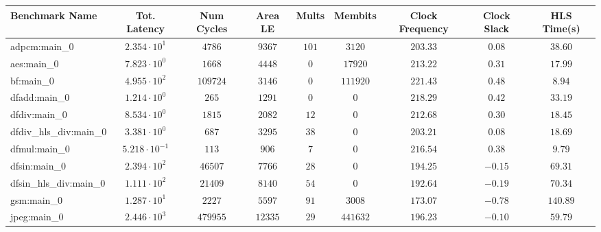 \begin{tabular}{|l|c|c|c|c|c|c|c|c|}
\hline
Benchmark Name          & Tot. Latency            & Num Cycles & Area LE   & Mults   & Membits    & Clock Frequency & Clock Slack & HLS Time(s) \\
\hline
adpcm:main\_0           & $ 2.354 \cdot 10^{1}  $ & $ 4786   $ & $ 9367  $ & $ 101 $ & $ 3120   $ & $ 203.33      $ & $ 0.08    $ & $ 38.60   $ \\
aes:main\_0             & $ 7.823 \cdot 10^{0}  $ & $ 1668   $ & $ 4448  $ & $ 0   $ & $ 17920  $ & $ 213.22      $ & $ 0.31    $ & $ 17.99   $ \\
bf:main\_0              & $ 4.955 \cdot 10^{2}  $ & $ 109724 $ & $ 3146  $ & $ 0   $ & $ 111920 $ & $ 221.43      $ & $ 0.48    $ & $ 8.94    $ \\
dfadd:main\_0           & $ 1.214 \cdot 10^{0}  $ & $ 265    $ & $ 1291  $ & $ 0   $ & $ 0      $ & $ 218.29      $ & $ 0.42    $ & $ 33.19   $ \\
dfdiv:main\_0           & $ 8.534 \cdot 10^{0}  $ & $ 1815   $ & $ 2082  $ & $ 12  $ & $ 0      $ & $ 212.68      $ & $ 0.30    $ & $ 18.45   $ \\
dfdiv\_hls\_div:main\_0 & $ 3.381 \cdot 10^{0}  $ & $ 687    $ & $ 3295  $ & $ 38  $ & $ 0      $ & $ 203.21      $ & $ 0.08    $ & $ 18.69   $ \\
dfmul:main\_0           & $ 5.218 \cdot 10^{-1} $ & $ 113    $ & $ 906   $ & $ 7   $ & $ 0      $ & $ 216.54      $ & $ 0.38    $ & $ 9.79    $ \\
dfsin:main\_0           & $ 2.394 \cdot 10^{2}  $ & $ 46507  $ & $ 7766  $ & $ 28  $ & $ 0      $ & $ 194.25      $ & $ -0.15   $ & $ 69.31   $ \\
dfsin\_hls\_div:main\_0 & $ 1.111 \cdot 10^{2}  $ & $ 21409  $ & $ 8140  $ & $ 54  $ & $ 0      $ & $ 192.64      $ & $ -0.19   $ & $ 70.34   $ \\
gsm:main\_0             & $ 1.287 \cdot 10^{1}  $ & $ 2227   $ & $ 5597  $ & $ 91  $ & $ 3008   $ & $ 173.07      $ & $ -0.78   $ & $ 140.89  $ \\
jpeg:main\_0            & $ 2.446 \cdot 10^{3}  $ & $ 479955 $ & $ 12335 $ & $ 29  $ & $ 441632 $ & $ 196.23      $ & $ -0.10   $ & $ 59.79   $ \\

\end{tabular}
